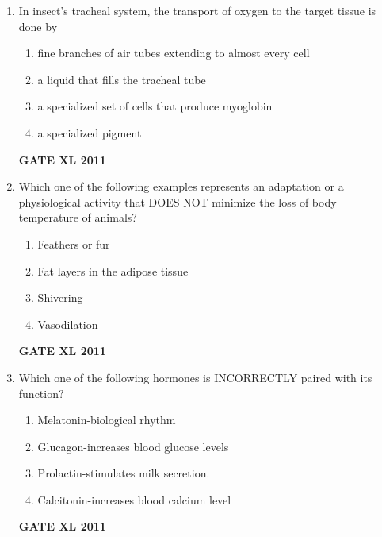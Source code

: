 \documentclass[journal,12pt,onecolumn]{IEEEtran}
\begin{document}
\begin{enumerate}
	\item{ In insect's tracheal system, the transport of oxygen to the target tissue is done by}
		\begin{enumerate}
			\item fine branches of air tubes extending to almost every cell
			\item a liquid that fills the tracheal tube
			\item a specialized set of cells that produce myoglobin
			\item a specialized pigment
		\end{enumerate}
		\hfill{\textbf{GATE XL 2011}}
\item {Which one of the following examples represents an adaptation or a physiological activity that DOES NOT minimize the loss of body temperature of animals?}
		\begin{enumerate}
			\item Feathers or fur
			\item Fat layers in the adipose tissue
			\item Shivering
			\item Vasodilation
		\end{enumerate}
		\hfill{\textbf{GATE XL 2011}}

	\item{ Which one of the following hormones is INCORRECTLY paired with its function?}
		\begin{enumerate}
			\item Melatonin-biological rhythm
			\item Glucagon-increases blood glucose levels
			\item Prolactin-stimulates milk secretion.
			\item Calcitonin-increases blood calcium level
		\end{enumerate}
		\hfill{\textbf{GATE XL 2011}}


\end{enumerate}
\end{document}
